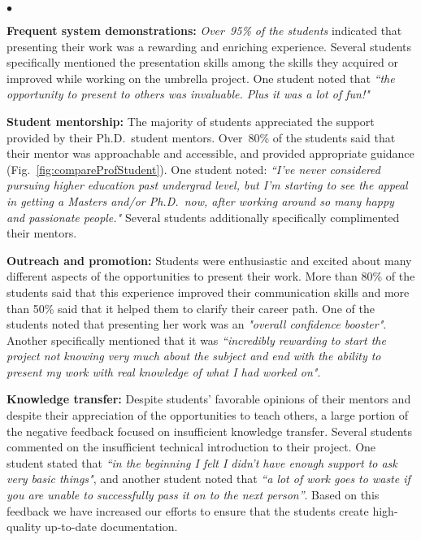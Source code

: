\documentclass[journal,twopages]{IEEEtran}
\newcommand{\makered}[1]{\color{black}#1\color{black}}
\newenvironment{myitemize}{\begin{list}{$\bullet$}{\renewcommand{\leftmargin}{0.2in}}}{\end{list}}
\begin{document}
\begin{myitemize}
\item  \textbf{Frequent system demonstrations:}
    \emph{Over~95\% of the students} indicated that presenting their work was a rewarding and enriching experience. Several students specifically mentioned the presentation skills among the skills they acquired or improved while working on the umbrella project.
    One student noted that
    \emph{``the opportunity to present to
    others was invaluable. Plus it was a lot of fun!"}

\item  \textbf{Student mentorship:} The majority of students appreciated the
    support provided by their Ph.D.\ student mentors.
    Over~80\% of the students said that their mentor was approachable and accessible, and provided appropriate guidance (Fig.~\ref{fig:compareProfStudent}).
    One student noted: \emph{``I've never considered pursuing higher education past undergrad level, but I'm starting to see the appeal in getting a Masters and/or Ph.D.\ now, after working around so many happy and passionate people."} Several students additionally specifically complimented their mentors.



\item  \textbf{Outreach and promotion:}
    \makered{Students were enthusiastic and excited about many different aspects of the
    opportunities to present their work. More than 80\% of the students said that this experience improved their communication skills and more than 50\% said that it helped them to clarify their career path. One of the students noted that presenting her work was an \emph{"overall confidence booster"}. Another specifically mentioned that it was \emph{``incredibly rewarding to start the project not knowing very much about the subject and end with the ability to present my work with real knowledge of what I had worked on"}}.

\item  \textbf{Knowledge transfer:} Despite students' favorable opinions of their mentors and despite their appreciation of the opportunities to teach others, a large portion of the negative feedback focused on insufficient knowledge transfer. Several students commented on the insufficient technical introduction to their project. One student stated that \emph{``in the beginning I felt I didn't have enough support to ask very basic things"}, and another student noted that \emph{``a lot of work goes to waste if you are unable to successfully pass it on to the next person''}. Based on this feedback we have increased our efforts to ensure that the students create high-quality up-to-date documentation.
\end{myitemize}
\end{document}
